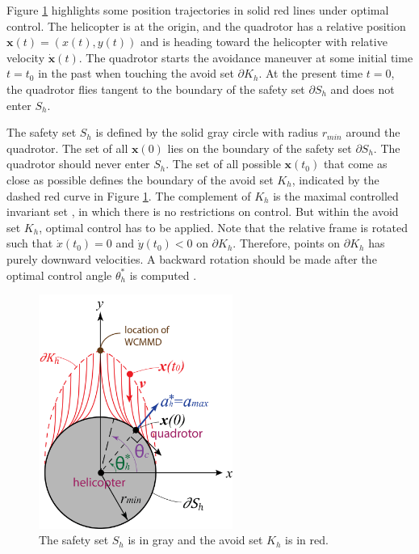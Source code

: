 \documentclass[journal,11pt,onecolumn,draftclsnofoot,]{IEEEtran}
\begin{document}
Figure \ref{fig:horiz_safety_set} highlights some position trajectories in solid red lines under optimal control. The helicopter is at the origin, and the quadrotor has a relative position $\boldsymbol{x}(t)=(x(t),y(t))$ and is heading toward the helicopter with relative velocity $\dot{\boldsymbol{x}}(t)$. The quadrotor starts the avoidance maneuver at some initial time $t=t_0$ in the past when touching the avoid set $\partial K_h$. At the present time $t=0$, the quadrotor flies tangent to the boundary of the safety set $\partial S_h$ and does not enter $S_h$.

The safety set $S_h$ is defined by the solid gray circle with radius $r_{min}$ around the quadrotor. The set of all $\boldsymbol{x}(0)$ lies on the boundary of the safety set $\partial S_h$. The quadrotor should never enter $S_h$. The set of all possible $\boldsymbol{x}(t_0)$ that come as close as possible defines the boundary of the avoid set $K_h$, indicated by the dashed red curve in Figure \ref{fig:horiz_safety_set}. The complement of $K_h$ is the maximal controlled invariant set \cite{lygeros1999controllers}, in which there is no restrictions on control. But within the avoid set $K_h$, optimal control has to be applied. Note that the relative frame is rotated such that $\dot{x} (t_0)=0$ and $\dot{y}(t_0)<0$ on $\partial K_h$. Therefore, points on $\partial K_h$ has purely downward velocities. A backward rotation should be made after the optimal control angle $\theta_h^*$ is computed \cite{hoffmann2008decentralized}.


\begin{figure}
	\centering
	\includegraphics[width=2.5in]{horizontal_safety_set}
	\caption{The safety set $S_h$ is in gray and the avoid set $K_h$ is in red.}
	\label{fig:horiz_safety_set}
\end{figure}
\end{document}
